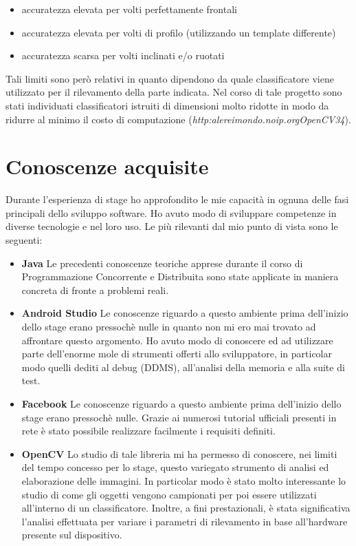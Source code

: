 \begin{itemize}
\item accuratezza elevata per volti perfettamente frontali
\item accuratezza elevata per volti di profilo (utilizzando un template differente)
\item accuratezza scarsa per volti inclinati e/o ruotati
\end{itemize}

Tali limiti sono però relativi in quanto dipendono da quale classificatore viene utilizzato per il rilevamento della parte indicata. Nel corso di tale progetto sono stati individuati classificatori istruiti di dimensioni molto ridotte in modo da ridurre al minimo il costo di computazione (\textit{http:\/\/alereimondo.no\-ip.org\/OpenCV\/34}). 

\section{Conoscenze acquisite}

Durante l'esperienza di stage ho approfondito le mie capacità in ognuna delle fasi principali
dello sviluppo software. Ho avuto modo di sviluppare competenze in diverse tecnologie e nel loro uso. Le più rilevanti dal mio punto di vista sono le seguenti:

\begin{itemize}
\item \textbf{Java} Le precedenti conoscenze teoriche apprese durante il corso di Programmazione Concorrente e Distribuita sono state applicate in maniera concreta di fronte a problemi reali. 
\item \textbf{Android Studio} Le conoscenze riguardo a questo ambiente prima dell'inizio dello stage erano pressochè nulle in quanto non mi ero mai trovato ad affrontare
questo argomento. Ho avuto modo di conoscere ed ad utilizzare parte dell'enorme mole di strumenti offerti allo sviluppatore, in particolar modo quelli dediti al debug (DDMS), all'analisi della memoria e alla suite di test.
\item \textbf{Facebook} Le conoscenze riguardo a questo ambiente prima dell'inizio dello stage erano pressochè nulle. Grazie ai numerosi tutorial ufficiali presenti in rete è stato possibile realizzare facilmente i requisiti definiti.
\item \textbf{OpenCV} Lo studio di tale libreria mi ha permesso di conoscere, nei limiti del tempo concesso per lo stage, questo variegato strumento di analisi ed elaborazione delle immagini. In particolar modo è stato molto interessante lo studio di come gli oggetti vengono campionati per poi essere utilizzati all'interno di un classificatore. Inoltre, a fini prestazionali, è stata significativa l'analisi effettuata per variare i parametri di rilevamento in base all'hardware presente sul dispositivo. 
\end{itemize}

